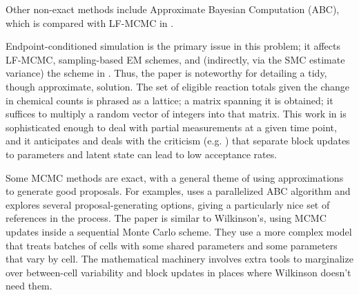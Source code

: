 \documentclass{article}
\begin{document}
Other non-exact methods include Approximate Bayesian Computation (ABC), which is compared with LF-MCMC in \cite{owen2014ABC_LF-MCMCcomparison}. 

Endpoint-conditioned simulation is the primary issue in this problem; it affects LF-MCMC, sampling-based EM schemes, and (indirectly, via the SMC estimate variance) the scheme in  \cite{golightly2011bayesian}. Thus, the paper \cite{amrein2012rate} is noteworthy for detailing a tidy, though approximate, solution. The set of eligible reaction totals given the change in chemical counts is phrased as a lattice; a matrix spanning it is obtained; it suffices to multiply a random vector of integers into that matrix. This work in \cite{amrein2012rate} is sophisticated enough to deal with partial measurements at a given time point, and it anticipates and deals with the criticism (e.g. \cite{golightly2011bayesian}) that separate block updates to parameters and latent state can lead to low acceptance rates.

Some MCMC methods are exact, with a general theme of using approximations to generate good proposals. For examples, \cite{owen2014scalable} uses a parallelized ABC algorithm and \cite{golightly2014smc_b_subtilis} explores several proposal-generating options, giving a particularly nice set of references in the process. %
The paper \cite{zechner2014scalable} is similar to Wilkinson's, using MCMC updates inside a sequential Monte Carlo scheme. They use a more complex model that treats batches of cells with some shared parameters and some parameters that vary by cell. The mathematical machinery involves extra tools to marginalize over between-cell variability and block updates in places where Wilkinson doesn't need them.



\begin{align*}
\end{align*}
\begin{align*}
\end{align*}
\begin{align*}
\end{align*}
\begin{align*}
\end{align*}
\end{document}
